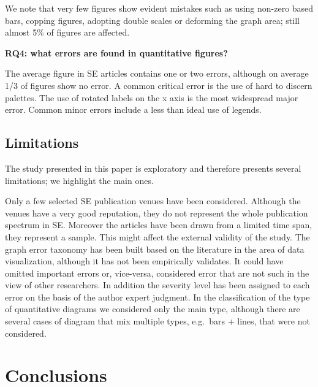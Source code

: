 \documentclass[
  10pt,
  conference,
]{IEEEtran}%
\begin{document}
We note that very few figures show evident mistakes such as using
non-zero based bars, copping figures, adopting double scales or
deforming the graph area; still almost 5\% of figures are affected.

\begin{tcolorbox}[enhanced jigsaw, arc=.35mm, breakable, left=2mm, colback=white, colframe=quarto-callout-note-color-frame, rightrule=.15mm, toprule=.15mm, opacityback=0, bottomrule=.15mm, leftrule=.75mm]

\vspace{-3mm}\textbf{RQ4: what errors are found in quantitative figures?}\vspace{3mm}

The average figure in SE articles contains one or two errors, although
on average 1/3 of figures show no error. A common critical error is the
use of hard to discern palettes. The use of rotated labels on the x axis
is the most widespread major error. Common minor errors include a less
than ideal use of legends.

\end{tcolorbox}

\subsection{Limitations}\label{limitations}

The study presented in this paper is exploratory and therefore presents
several limitations; we highlight the main ones.

Only a few selected SE publication venues have been considered. Although
the venues have a very good reputation, they do not represent the whole
publication spectrum in SE. Moreover the articles have been drawn from a
limited time span, they represent a sample. This might affect the
external validity of the study. The graph error taxonomy has been built
based on the literature in the area of data visualization, although it
has not been empirically validates. It could have omitted important
errors or, vice-versa, considered error that are not such in the view of
other researchers. In addition the severity level has been assigned to
each error on the basis of the author expert judgment. In the
classification of the type of quantitative diagrams we considered only
the main type, although there are several cases of diagram that mix
multiple types, e.g.~bars + lines, that were not considered.

\section{Conclusions}\label{conclusions}
\end{document}
